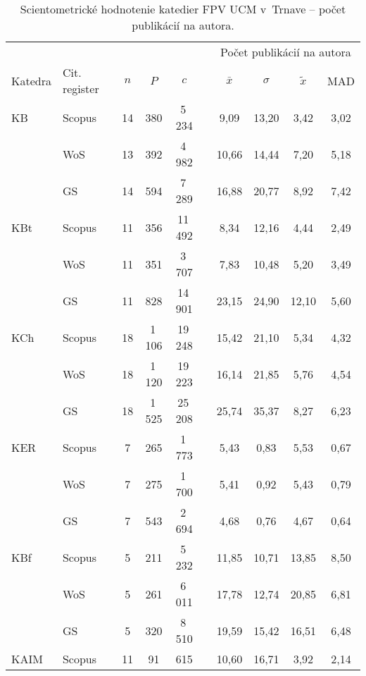 \begin{table}
  \centering\small
  \caption[Hodnotenie FPV -- počet publikácií na autora]%
  {Scientometrické hodnotenie katedier FPV UCM v~Trnave -- počet publikácií na
    autora.}
  \label{tab:1-staff.results}
  \begin{tabularx}{\textwidth}{XXp{0.7ex}c@{\hspace{2.5em}}c@{\hspace{2.5em}}cp{0.7ex}cccc}
    \toprule
    & & & & & & & \multicolumn{4}{c}{Počet publikácií na autora} \\
    \cmidrule{8-11}
    Katedra & \multicolumn{2}{l}{Cit. register} & $n$ & $P$ & $c$ & & $\bar{x}$ & $\sigma$ & $\tilde{x}$ & MAD \\
    \midrule
    KB   & Scopus & & 14 & 380    & 5\,234  & & 9,09  & 13,20 & 3,42  & 3,02 \\
         & WoS    & & 13 & 392    & 4\,982  & & 10,66 & 14,44 & 7,20  & 5,18 \\
         & GS     & & 14 & 594    & 7\,289  & & 16,88 & 20,77 & 8,92  & 7,42 \\[1ex]
    KBt  & Scopus & & 11 & 356    & 11\,492 & & 8,34  & 12,16 & 4,44  & 2,49 \\
         & WoS    & & 11 & 351    & 3\,707  & & 7,83  & 10,48 & 5,20  & 3,49 \\
         & GS     & & 11 & 828    & 14\,901 & & 23,15 & 24,90 & 12,10 & 5,60 \\[1ex]
    KCh  & Scopus & & 18 & 1\,106 & 19\,248 & & 15,42 & 21,10 & 5,34  & 4,32 \\
         & WoS    & & 18 & 1\,120 & 19\,223 & & 16,14 & 21,85 & 5,76  & 4,54 \\
         & GS     & & 18 & 1\,525 & 25\,208 & & 25,74 & 35,37 & 8,27  & 6,23 \\[1ex]
    KER  & Scopus & & 7  & 265    & 1\,773  & & 5,43  & 0,83  & 5,53  & 0,67 \\
         & WoS    & & 7  & 275    & 1\,700  & & 5,41  & 0,92  & 5,43  & 0,79 \\
         & GS     & & 7  & 543    & 2\,694  & & 4,68  & 0,76  & 4,67  & 0,64 \\[1ex]
    KBf  & Scopus & & 5  & 211    & 5\,232  & & 11,85 & 10,71 & 13,85 & 8,50 \\
         & WoS    & & 5  & 261    & 6\,011  & & 17,78 & 12,74 & 20,85 & 6,81 \\
         & GS     & & 5  & 320    & 8\,510  & & 19,59 & 15,42 & 16,51 & 6,48 \\[1ex]
    KAIM & Scopus & & 11 & 91     & 615     & & 10,60 & 16,71 & 3,92  & 2,14 \\

\end{tabularx}
\end{table}
